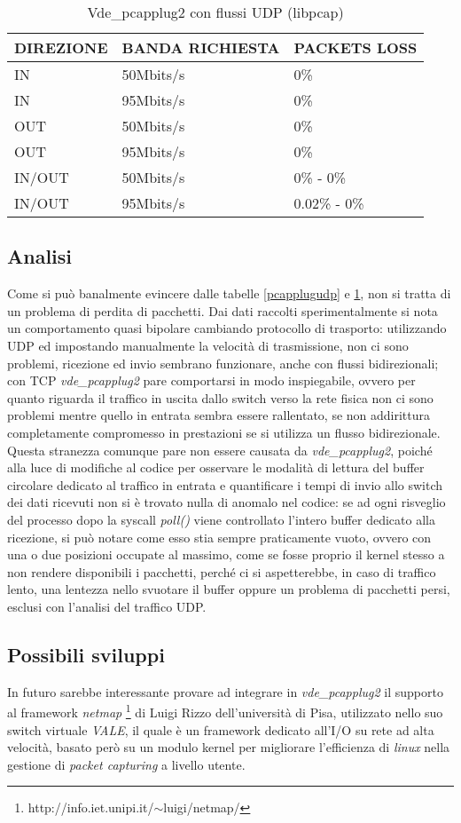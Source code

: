 \begin{table}[h]
\begin{tabular}{|p{}|p{}|p{}|}
\hline
DIREZIONE    & BANDA RICHIESTA   &  PACKETS LOSS   \\
\hline
\hline
IN       & 50Mbits/s  &  0\%   \\
\hline
IN       & 95Mbits/s  &  0\%   \\
\hline
OUT      & 50Mbits/s  &  0\%  \\
\hline
OUT      & 95Mbits/s  &  0\%  \\
\hline
IN/OUT   & 50Mbits/s  &  0\% - 0\%   \\
\hline
IN/OUT   & 95Mbits/s  &  0.02\% - 0\%   \\
\hline
\end{tabular}
\caption{Vde\_pcapplug2 con flussi UDP (libpcap)}
\label{pcapplugudpx}
\end{table}
\subsection{Analisi}
Come si può banalmente evincere dalle tabelle {\ref{pcapplugudp}} e {\ref{pcapplugudpx}}, non si tratta di un problema di perdita di pacchetti. Dai dati raccolti sperimentalmente si nota un comportamento quasi bipolare cambiando protocollo di trasporto: utilizzando UDP ed impostando manualmente la velocità di trasmissione, non ci sono problemi, ricezione ed invio sembrano funzionare, anche con flussi bidirezionali; con TCP {\em vde\_pcapplug2} pare comportarsi in modo inspiegabile, ovvero per quanto riguarda il traffico in uscita dallo switch verso la rete fisica non ci sono problemi mentre quello in entrata sembra essere rallentato, se non addirittura completamente compromesso in prestazioni se si utilizza un flusso bidirezionale. Questa stranezza comunque pare non essere causata da {\em vde\_pcapplug2}, poiché alla luce di modifiche al codice per osservare le modalità di lettura del buffer circolare dedicato al traffico in entrata e quantificare i tempi di invio allo switch dei dati ricevuti non si è trovato nulla di anomalo nel codice: se ad ogni risveglio del processo dopo la syscall {\em poll()} viene controllato l'intero buffer dedicato alla ricezione, si può notare come esso stia sempre praticamente vuoto, ovvero con una o due posizioni occupate al massimo, come se fosse proprio il kernel stesso a non rendere disponibili i pacchetti, perché ci si aspetterebbe, in caso di traffico lento, una lentezza nello svuotare il buffer oppure un problema di pacchetti persi, esclusi con l'analisi del traffico UDP.
\subsection{Possibili sviluppi}
In futuro sarebbe interessante provare ad integrare in {\em vde\_pcapplug2} il supporto al framework {\em netmap} \footnote{http://info.iet.unipi.it/$\sim$luigi/netmap/} di Luigi Rizzo dell'università di Pisa, utilizzato nello suo switch virtuale {\em VALE}, il quale è un framework dedicato all'I/O su rete ad alta velocità, basato però su un modulo kernel per migliorare l'efficienza di {\em linux} nella gestione di {\em packet capturing} a livello utente.